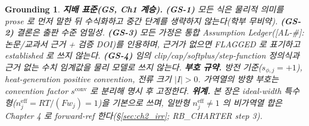 \documentclass[11pt,a4paper]{article}
\newtheorem*{groundingbox}{Grounding}
\newcommand{\eff}{\mathrm{eff}}
\newcommand{\conv}{\mathrm{conv}}
\newcommand{\AL}[1]{\textsf{[AL-#1]}}
\begin{document}
\begin{groundingbox}
\textbf{지배 표준(GS, Ch1 계승).} \textbf{(GS-1)} 모든 식은 물리적 의미를 prose 로 먼저 말한 뒤 수식화하고
중간 단계를 생략하지 않는다(학부 무비약). \textbf{(GS-2)} 결론은 출판 수준 엄밀성. \textbf{(GS-3)} 모든 가정은
통합 Assumption Ledger(\AL{\#}: 논문/교과서 근거 + 검증 DOI)를 인용하며, 근거가 없으면 FLAGGED 로 표기하고
established 로 쓰지 않는다. \textbf{(GS-4)} 임의 clip/cap/softplus/step-function 정의식과 근거 없는 수치
임계값을 물리 모델로 쓰지 않는다. \textbf{부호 규약.} 방전 기준($s_{\phi,j}=+1$), heat-generation positive
convention, 전류 크기 $|I|>0$. 가역열의 방향 부호는 convention factor $s^{\conv}$ 로 분리해 명시 후 고정한다.
\textbf{위계.} 본 장은 \emph{ideal-width 특수형}($n_j^{\eff}=RT/(Fw_j)=1$)을 기본으로 쓰며, 일반형
$n_j^{\eff}\ne1$ 의 비가역열 합은 Chapter 4 로 forward-ref 한다(\S\ref{sec:ch2_irr}; RB\_CHARTER step 3).
\end{groundingbox}

\tableofcontents
\newpage

\end{document}
